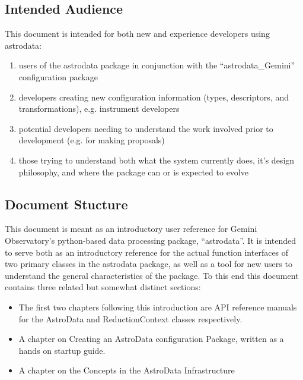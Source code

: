 \documentclass[letterpaper,10pt,english]{sphinxmanual}
\begin{document}
\subsection{Intended Audience}
\label{gen.ADMANUAL_Purpose::doc}\label{gen.ADMANUAL_Purpose:intended-audience}
This document is intended for both new and experience developers using
astrodata:
\begin{enumerate}
\item {} 
users of the astrodata package in conjunction with the
``astrodata\_Gemini'' configuration package

\item {} 
developers creating new configuration information (types,
descriptors, and transformations), e.g. instrument developers

\item {} 
potential developers needing to understand the work involved prior
to development (e.g. for making proposals)

\item {} 
those trying to understand both what the system currently does,
it's design philosophy, and where the package can or is expected to
evolve

\end{enumerate}


\subsection{Document Stucture}
\label{gen.ADMANUAL_Purpose:document-stucture}
This document is meant as an introductory user reference for Gemini
Observatory's python-based data processing package, ``astrodata''. It is
intended to serve both as an introductory reference for the actual
function interfaces of two primary classes in the astrodata package,
as well as a tool for new users to understand the general
characteristics of the package. To this end this document contains
three related but somewhat distinct sections:
\begin{itemize}
\item {} 
The first two chapters following this introduction are API reference
manuals for the AstroData and ReductionContext classes respectively.

\item {} 
A chapter on Creating an AstroData configuration Package, written as
a hands on startup guide.

\item {} 
A chapter on the Concepts in the AstroData Infrastructure

\end{itemize}
\end{document}
